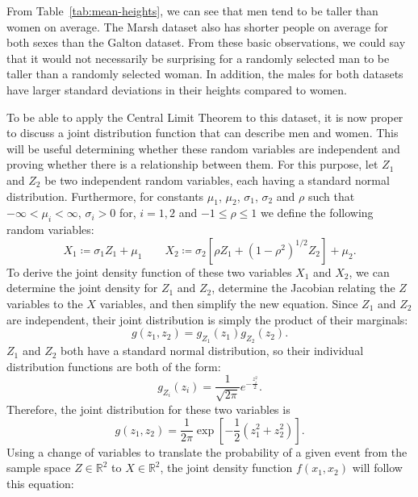 From Table~\ref{tab:mean-heights}, we can see that men tend to be taller than women on average.
The Marsh dataset also has shorter people on average for both sexes than the Galton dataset.
From these basic observations, we could say that it would not necessarily be surprising for a randomly selected man to be taller than a randomly selected woman.
In addition, the males for both datasets have larger standard deviations in their heights compared to women.

To be able to apply the Central Limit Theorem to this dataset, it is now proper to discuss a joint distribution function that can describe men and women.
This will be useful determining whether these random variables are independent and proving whether there is a relationship between them.
For this purpose, let $Z_1$ and $Z_2$ be two independent random variables, each having a standard normal distribution.
Furthermore, for constants $\mu_1$, $\mu_2$, $\sigma_1$, $\sigma_2$ and $\rho$ such that $-\infty < \mu_i < \infty$, $\sigma_i > 0$ for, $i=1,2$ and $-1 \le \rho \le 1$ we define the following random variables:
\begin{equation}
    X_1 \coloneqq \sigma_1 Z_1 + \mu_1 \qquad X_2 \coloneqq \sigma_2 [\rho Z_1 + (1-\rho^2)^{1/2} Z_2] + \mu_2.
    \label{eq:definitions-of-x-variables}
\end{equation}
To derive the joint density function of these two variables $X_1$ and $X_2$, we can determine the joint density for $Z_1$ and $Z_2$, determine the Jacobian relating the $Z$ variables to the $X$ variables, and then simplify the new equation.
Since $Z_1$ and $Z_2$ are independent, their joint distribution is simply the product of their marginals:
\begin{equation}
    g(z_1, z_2) = g_{Z_1}(z_1)g_{Z_2}(z_2).
    \label{eq:joint-dist-for-independent-vars}
\end{equation}
$Z_1$ and $Z_2$ both have a standard normal distribution, so their individual distribution functions are both of the form:
\begin{equation}
    g_{Z_i}(z_i)=\frac{1}{\sqrt{2\pi}}e^{-\frac{z_i^2}{2}}.
    \label{eq:std-normal-distribution}
\end{equation}
Therefore, the joint distribution for these two variables is
\begin{equation}
    g(z_1,z_2)=\frac{1}{2\pi}\exp\left[-\frac{1}{2}(z_1^2+z_2^2)\right].
    \label{eq:joint-normal-distribution}
\end{equation}
Using a change of variables to translate the probability of a given event from the sample space $Z\in\mathbb{R}^2$ to $X\in\mathbb{R}^2$, the joint density function $f(x_1, x_2)$ will follow this equation:
